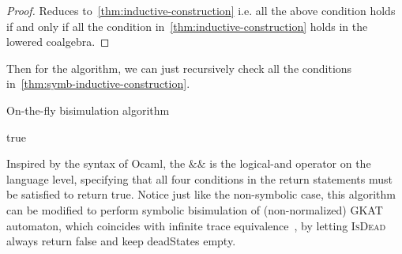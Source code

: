 \documentclass[conference]{IEEEtran}
\begin{document}
\begin{proof}
    Reduces to~\cref{thm:inductive-construction} i.e. all the above condition holds if and only if all the condition in~\cref{thm:inductive-construction} holds in the lowered coalgebra.
\end{proof}

Then for the algorithm, we can just recursively check all the conditions in~\cref{thm:symb-inductive-construction}.

\begin{algorithm*}
    \caption{On-the-fly bisimulation algorithm}\label{alg:symb-bisim}
    \begin{algorithmic}
         {\Return true}
         {\Return {}} 
         {\Return {}} 
        \Else {}
        \EndIf
        \EndFunction
    \end{algorithmic}
\end{algorithm*}

Inspired by the syntax of Ocaml, the \(\mathrel{\&\!\&}\) is the logical-and operator on the language level, specifying that all four conditions in the return statements must be satisfied to return true. 
Notice just like the non-symbolic case, this algorithm can be modified to perform symbolic bisimulation of (non-normalized) GKAT automaton, which coincides with infinite trace equivalence~\cite{schmid_GuardedKleeneAlgebra_2021}, by letting \textsc{IsDead} always return false and keep deadStates empty.
\end{document}
